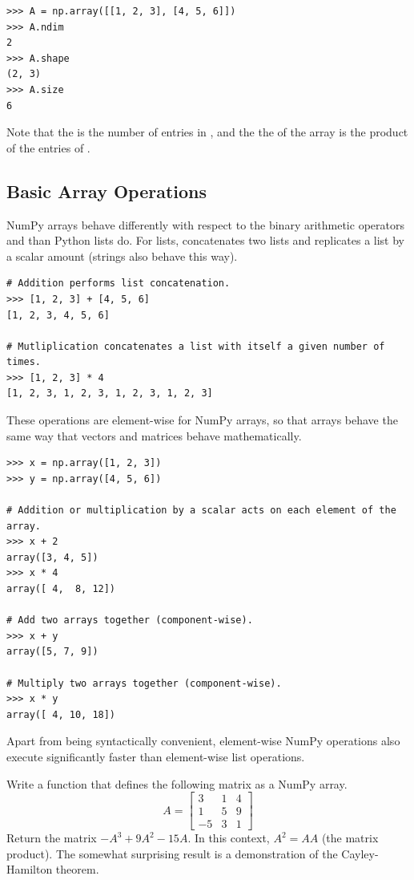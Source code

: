 \begin{lstlisting}
>>> A = np.array([[1, 2, 3], [4, 5, 6]])
>>> A.ndim
2
>>> A.shape
(2, 3)
>>> A.size
6
\end{lstlisting}

Note that the  is the number of entries in , and the
the  of the array is the product of the entries of .

\subsection*{Basic Array Operations} %

NumPy arrays behave differently with respect to the binary arithmetic operators \li{+} and \li{*} than Python lists do.
For lists, \li{+} concatenates two lists and \li{*} replicates a list by a scalar amount (strings also behave this way).

\begin{lstlisting}
# Addition performs list concatenation.
>>> [1, 2, 3] + [4, 5, 6]
[1, 2, 3, 4, 5, 6]

# Mutliplication concatenates a list with itself a given number of times.
>>> [1, 2, 3] * 4
[1, 2, 3, 1, 2, 3, 1, 2, 3, 1, 2, 3]
\end{lstlisting}

These operations are element-wise for NumPy arrays, so that arrays behave the same way that vectors and matrices behave mathematically.

\begin{lstlisting}
>>> x = np.array([1, 2, 3])
>>> y = np.array([4, 5, 6])

# Addition or multiplication by a scalar acts on each element of the array.
>>> x + 2
array([3, 4, 5])
>>> x * 4
array([ 4,  8, 12])

# Add two arrays together (component-wise).
>>> x + y
array([5, 7, 9])

# Multiply two arrays together (component-wise).
>>> x * y
array([ 4, 10, 18])
\end{lstlisting}

Apart from being syntactically convenient, element-wise NumPy operations also execute significantly faster than element-wise list operations.

\begin{problem} %
Write a function that defines the following matrix as a NumPy array.
\[
A = \left[\begin{array}{rrr}
3 & 1 & 4\\ 
1 & 5 & 9 \\
-5 & 3 & 1 \end{array}\right]
\]
Return the matrix $-A^3 + 9A^2 - 15A$.
In this context, $A^2 = AA$ (the matrix product).
The somewhat surprising result is a demonstration of the Cayley-Hamilton theorem.
\label{prob:simple2}
\end{problem}

